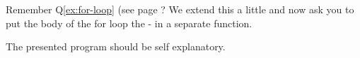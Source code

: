 \begin{Exercise}[title={For-loop II},difficulty=1]
\label{ex:for-loop II}
\Question Remember Q\ref{ex:for-loop} (see page \pageref{ex;for-loop}?
We extend this a little and now ask you to put the body of the for loop
the  - in a separate function.
\end{Exercise}

\begin{Answer}
\begin{minipage}{\textwidth}

\end{minipage}

The presented program should be self explanatory.
\end{Answer}
